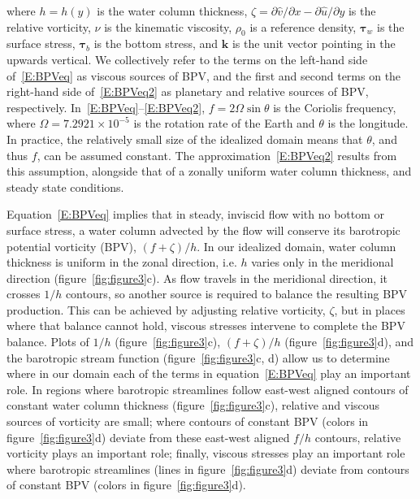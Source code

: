 \documentclass[draft]{agujournal2019}
\begin{document}
where $h = h(y)$ is the water column thickness, $\zeta = \partial \hat{v} / \partial x - \partial \hat{u} / \partial y$ is the relative vorticity,  $\nu$ is the kinematic viscosity, $\rho_0$ is a reference density, $\mathbf{\tau}_w$ is the surface stress, $\mathbf{\tau}_b$ is the bottom stress, and $\mathbf{k}$ is the unit vector pointing in the upwards vertical. We collectively refer to the terms on the left-hand side of~\eqref{E:BPVeq} as viscous sources of BPV, and the first and second terms on the right-hand side of~\eqref{E:BPVeq2} as planetary and relative sources of BPV, respectively. In~\eqref{E:BPVeq}--\eqref{E:BPVeq2}, $f = 2\Omega \sin \theta$ is the Coriolis frequency, where $\Omega = 7.2921\times10^{-5}$ is the rotation rate of the Earth and $\theta$ is the longitude. In practice, the relatively small size of the idealized domain means that $\theta$, and thus $f$, can be assumed constant.  The approximation~\eqref{E:BPVeq2} results from this assumption, alongside that of a zonally uniform water column thickness, and steady state conditions.

Equation~\eqref{E:BPVeq} implies that in steady, inviscid flow with no bottom or surface stress, a water column advected by the flow will conserve its barotropic potential vorticity (BPV), $(f + \zeta)/h$. In our idealized domain, water column thickness is uniform in the zonal direction, i.e. $h$ varies only in the meridional direction (figure~\ref{fig:figure3}c). As flow travels in the meridional direction, it crosses $1/h$ contours, so another source is required to balance the resulting BPV production. This can be achieved by adjusting relative vorticity, $\zeta$, but in places where that balance cannot hold, viscous stresses intervene to complete the BPV balance. Plots of $1/h$ (figure~\ref{fig:figure3}c), $(f + \zeta)/h$ (figure~\ref{fig:figure3}d), and the barotropic stream function (figure~\ref{fig:figure3}c, d) allow us to determine where in our domain each of the terms in equation~\eqref{E:BPVeq} play an important role. In regions where barotropic streamlines follow east-west aligned contours of constant water column thickness (figure~\ref{fig:figure3}c), relative and viscous sources of vorticity are small; where contours of constant BPV (colors in figure~\ref{fig:figure3}d) deviate from these east-west aligned $f/h$ contours, relative vorticity plays an important role; finally, viscous stresses play an important role where barotropic streamlines (lines in figure~\ref{fig:figure3}d) deviate from contours of constant BPV (colors in figure~\ref{fig:figure3}d).
\end{document}
